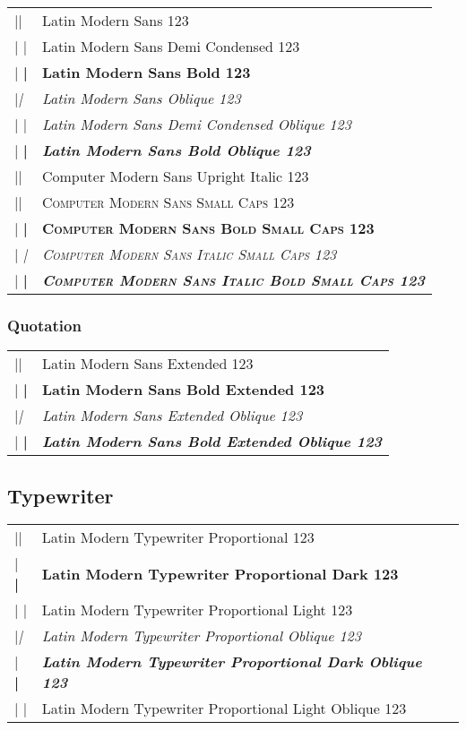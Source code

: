 \documentclass{article}
\makeatletter
\newenvironment{vrb}{\begin{tabular}{@{}p{5cm}l@{}}}{\end{tabular}}
\makeatother
\begin{document}
\sffamily
\begin{vrb}
|\sffamily| & {Latin Modern Sans 123} \\
|  \fontseries{sbc}\selectfont| & {\fontseries{sbc}\selectfont Latin Modern Sans Demi Condensed 123} \\
|  \bfseries| & {\bfseries Latin Modern Sans Bold 123} \\
|\slshape| & {\slshape Latin Modern Sans Oblique 123} \\
|  \fontseries{sbc}\selectfont| & {\fontseries{sbc}\selectfont\slshape Latin Modern Sans Demi Condensed Oblique 123} \\
|  \bfseries| & {\bfseries\slshape Latin Modern Sans Bold Oblique 123} \\
|\uishape| & {\uishape Computer Modern Sans Upright Italic 123} \\
|\scshape| & {\scshape Computer Modern Sans Small Caps 123} \\
|  \bfseries| & {\bfseries\scshape Computer Modern Sans Bold Small Caps 123} \\
|  \itshape| & {\itshape\scshape Computer Modern Sans Italic Small Caps 123} \\
|    \bfseries| & {\itshape\bfseries\scshape Computer Modern Sans Italic Bold Small Caps 123} \\
\end{vrb}

\subsubsection*{Quotation}

\qtstyle
\begin{vrb}
|\qtstyle | & {Latin Modern Sans Extended 123} \\
|  \bfseries | & {\bfseries Latin Modern Sans Bold Extended 123} \\
|\slshape | & {\slshape Latin Modern Sans Extended Oblique 123} \\
|  \bfseries | & {\bfseries\slshape Latin Modern Sans Bold Extended Oblique 123} \\
\end{vrb}

\subsection*{Typewriter}

\ttfamily
\tvstyle
\begin{vrb}
|\ttfamily\tvstyle | & {Latin Modern Typewriter Proportional 123} \\
|  \bfseries | & {\bfseries Latin Modern Typewriter Proportional Dark 123} \\
|  \lgweight | & {\lgweight Latin Modern Typewriter Proportional Light 123} \\
|\slshape | & {\slshape Latin Modern Typewriter Proportional Oblique 123} \\
|  \bfseries | & {\bfseries\slshape Latin Modern Typewriter Proportional Dark Oblique 123} \\
|  \lgweight | & {\lgweight Latin Modern Typewriter Proportional Light Oblique 123} \\
\end{vrb}
\end{document}
